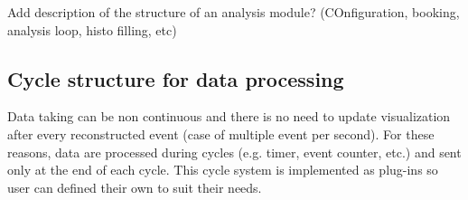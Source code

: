 \documentclass[conference]{IEEEtran}
\begin{document}
{\color{red}Add description of the structure of an analysis module? (COnfiguration, booking, analysis loop, histo filling, etc)}

\subsection{Cycle structure for data processing}
Data taking can be non continuous and there is no need to update visualization after every reconstructed event (case of multiple event per second). For these reasons, data are processed during cycles (e.g. timer, event counter, etc.) and sent only at the end of each cycle. This cycle system is implemented as plug-ins so user can defined their own to suit their needs.

\begin{figure}[htbp]
  \begin{center}

\end{center}
\end{figure}
\end{document}
